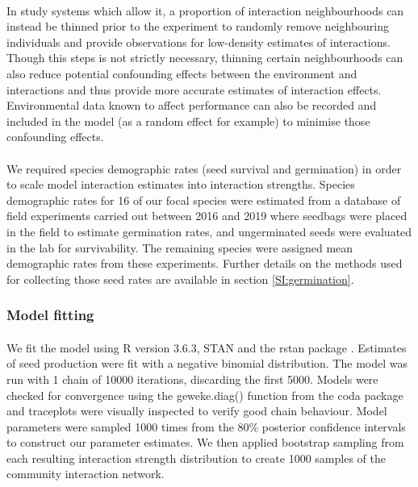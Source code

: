 \begin{refsection}
        \paragraph{}
    	In study systems which allow it, a proportion of interaction neighbourhoods can instead be thinned prior to the experiment to randomly remove neighbouring individuals and provide observations for low-density estimates of interactions. Though this steps is not strictly necessary, thinning certain neighbourhoods can also reduce potential confounding effects between the environment and interactions and thus provide more accurate estimates of interaction effects. Environmental data known to affect performance can also be recorded and included in the model (as a random effect for example) to minimise those confounding effects.

        \paragraph{} 
        We required species demographic rates (seed survival and germination) in order to scale model interaction estimates into interaction strengths. Species demographic rates for 16 of our focal species were estimated from a database of field experiments carried out between 2016 and 2019 where seedbags were placed in the field to estimate germination rates, and ungerminated seeds were evaluated in the lab for survivability.  The remaining species were assigned mean demographic rates from these experiments. Further details on the methods used for collecting those seed rates are available in section \ref{SI:germination}.

        \subsubsection{Model fitting}

        \paragraph{}
        We fit the model using R version 3.6.3, STAN and the rstan package \parencite{R2020, Carpenter2017, Rstan2020}. Estimates of seed production were fit with a negative binomial distribution. The model was run with 1 chain of 10000 iterations, discarding the first 5000. Models were checked for convergence using the geweke.diag() function from the coda package \parencite{Plummer2006} and traceplots were visually inspected to verify good chain behaviour. Model parameters were sampled 1000 times from the 80\% posterior confidence intervals to construct our parameter estimates. We then applied bootstrap sampling from each resulting interaction strength distribution to create 1000 samples of the community interaction network.


\end{refsection}

